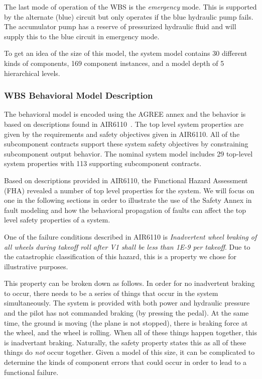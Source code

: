 The last mode of operation of the WBS is the \textit{emergency} mode. This is supported by the alternate (blue) circuit but only operates if the blue hydraulic pump fails. The accumulator pump has a reserve of pressurized hydraulic fluid and will supply this to the blue circuit in emergency mode.

To get an idea of the size of this model, the system model contains 30 different kinds of components, 169 component instances, and a model depth of 5 hierarchical levels. 

\subsubsection{WBS Behavioral Model Description}
\label{subsubsec:wbs_behavior}
The behavioral model is encoded using the AGREE annex and the behavior is based on descriptions found in AIR6110~\cite{AIR6110}. The top level system properties are given by the requirements and safety objectives given in AIR6110. All of the subcomponent contracts support these system safety objectives by constraining subcomponent output behavior. The nominal system model includes 29 top-level system properties with 113 supporting subcomponent contracts. 

Based on descriptions provided in AIR6110, the Functional Hazard Assessment (FHA) revealed a number of top level properties for the system. We will focus on one in the following sections in order to illustrate the use of the Safety Annex in fault modeling and how the behavioral propagation of faults can affect the top level safety properties of a system. 

One of the failure conditions described in AIR6110 is \textit{Inadvertent wheel braking of all wheels during takeoff roll after V1 shall be less than 1E-9 per takeoff}. Due to the catastrophic classification of this hazard, this is a property we chose for illustrative purposes. 

This property can be broken down as follows. In order for no inadvertent braking to occur, there needs to be a series of things that occur in the system simultaneously. The system is provided with both power and hydraulic pressure and the pilot has not commanded braking (by pressing the pedal). At the same time, the ground is moving (the plane is not stopped), there is braking force at the wheel, and the wheel is rolling. When all of these things happen together, this is inadvertant braking. Naturally, the safety property states this as all of these things do \textit{not} occur together. Given a model of this size, it can be complicated to determine the kinds of component errors that could occur in order to lead to a functional failure. 

